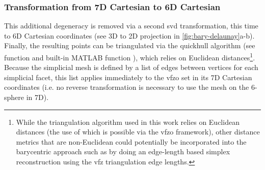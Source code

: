 \documentclass[final,twocolumn,12pt]{elsarticle}
\begin{document}
\begin{appendices}
\subsubsection{ Transformation from 7D Cartesian to 6D Cartesian}
\label{sec:app:bary:tri:svd2}
This additional degeneracy is removed via a second \gls{svd} transformation, this time to 6D Cartesian coordinates (see 3D to 2D projection in \cref{fig:bary-delaunay}a-b). Finally, the resulting points can be triangulated via the quickhull algorithm \cite{barberQuickhullAlgorithmConvex1996} (see \vfzorepo{} function  and built-in MATLAB function ), which relies on Euclidean distances\footnote{While the triangulation algorithm used in this work relies on Euclidean distances (the use of which is possible via the \gls{vfzo} framework), other distance metrics that are non-Euclidean \cite{morawiecDistancesGrainInterfaces2019} could potentially be incorporated into the barycentric approach such as by doing an edge-length based simplex reconstruction \cite{connorHighdimensionalSimplexesSupermetric2017,boissonnatOnlyDistancesAre2017} using the \gls{vfz} triangulation edge lengths.}. Because the simplicial mesh is defined by a list of edges between vertices for each simplicial facet, this list applies immediately to the \gls{vfzo} set in its 7D Cartesian coordinates (i.e. no reverse transformation is necessary to use the mesh on the 6-sphere in 7D).



\end{appendices}
\end{document}
